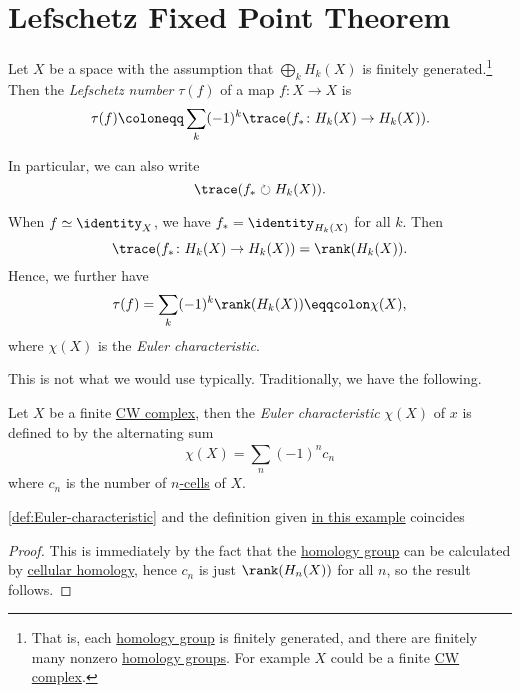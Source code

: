 \section{Lefschetz Fixed Point Theorem}
\begin{definition}\label{def:Lefschetz-number}
	Let \(X\) be a space with the assumption that \(\bigoplus_k H_k(X)\) is finitely generated.\footnote{That is, each \hyperref[def:homology-group]{homology group}
		is finitely	generated, and there are finitely many nonzero \hyperref[def:homology-group]{homology groups}.
		For example \(X\) could be a finite \hyperref[def:CW-Complex]{CW complex}.}
	Then the \emph{Lefschetz number} \(\tau(f)\) of a map \(f \colon X \to X\) is
	\[
		\tau(f) \coloneqq \sum_k (-1)^k \trace(f_\ast \colon H_k(X) \to H_k(X)).
	\]
\end{definition}
\begin{remark}
	In particular, we can also write
	\[
		\trace(f_{\ast} \circlearrowright H_{k} (X)).
	\]
\end{remark}

\begin{eg}\label{eg:lec-36}
	When \(f \simeq \identity _X\), we have \(f_\ast = \identity_{H_k(X)}\) for all \(k\).
	Then
	\[
		\trace(f_\ast \colon H_k(X) \to H_k(X)) = \rank(H_k(X)).
	\]
	Hence, we further have
	\[
		\tau(f) = \sum_k (-1)^k\rank(H_k(X)) \eqqcolon \chi(X),
	\]
	where \(\chi(X)\) is the \emph{Euler characteristic}.
\end{eg}

This is not what we would use typically. Traditionally, we have the following.
\begin{definition}\label{def:Euler-characteristic}
	Let \(X\) be a finite \hyperref[def:CW-Complex]{CW complex},
	then the \emph{Euler characteristic} \(\chi (X)\) of \(x\) is defined to by the alternating sum
	\[
		\chi (X) = \sum_{n}^{} (-1)^{n} c_{n}
	\]
	where \(c_{n} \) is the number of \hyperref[def:cell]{\(n\)-cells} of \(X\).
\end{definition}

\begin{proposition}
	\autoref{def:Euler-characteristic} and the definition given \hyperref[eg:lec-36]{in this example} coincides
\end{proposition}
\begin{proof}
	This is immediately by the fact that the \hyperref[def:homology-group]{homology group} can be calculated by \hyperref[def:cellular-homology-group]{cellular homology},
	hence \(c_{n}\) is just \(\rank(H_{n} (X))\) for all \(n\), so the result follows.
\end{proof}

